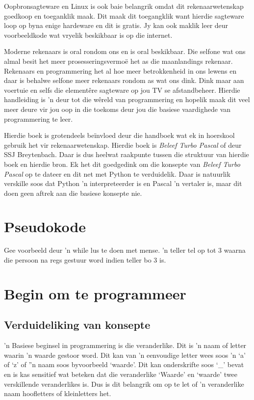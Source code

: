 Oopbronsagteware en Linux is ook baie belangrik omdat dit rekenaarwetenskap goedkoop en toeganklik maak.  Dit maak dit toegangklik want hierdie sagteware loop op byna enige hardeware en dit is gratis.  Jy kan ook maklik leer deur voorbeeldkode wat vryelik beskikbaar is op die internet.

Moderne rekenaars is oral rondom ons en is oral beskikbaar.  Die selfone wat ons almal besit het meer prosesseringsvermo\"e het as die maanlandings rekenaar.  Rekenaars en programmering het al hoe meer betrokkenheid in ons lewens en daar is behalwe selfone meer rekenaars rondom as wat ons dink.  Dink maar aan voertuie en selfs die element\^ere sagteware op jou TV se afstandbeheer.  Hierdie handleiding is 'n deur tot die w\^ereld van programmering en hopelik maak dit veel meer deure vir jou oop in die toekoms deur jou die basiese vaardighede van programmering te leer.


Hierdie boek is grotendeels be\"invloed deur die handboek wat ek in ho\:erskool gebruik het vir rekenaarwetenskap.  Hierdie boek is \emph{Beleef Turbo Pascal} of \cite{beleef} deur SSJ Breytenbach.  Daar is dus heelwat raakpunte tussen die struktuur van hierdie boek en hierdie bron.  Ek het dit goedgedink om die konsepte van \emph{Beleef Turbo Pascal} op te dateer en dit net met Python te verduidelik.  Daar is natuurlik verskille soos dat Python 'n interpreteerder is en Pascal 'n vertaler is, maar dit doen geen aftrek aan die basiese konsepte nie.



\chapter[Pseudokode]
{Pseudokode}
  

Gee voorbeeld deur 'n while lus te doen met mense. 'n teller tel op tot 3 waarna die persoon na regs gestuur word indien teller bo 3 is.



\chapter[Die begin]
{Begin om te programmeer}

\section{Verduideliking van konsepte}

'n Basiese beginsel in programmering is die veranderlike.  Dit is 'n naam of letter waarin 'n waarde gestoor word.  Dit kan van 'n eenvoudige letter wees soos 'n `a' of `z' of ''n naam soos byvoorbeeld `waarde'.  Dit kan onderskrifte soos `\_' bevat en is kas sensitief wat beteken dat die veranderlike `Waarde' en `waarde' twee verskillende veranderlikes is.  Dus is dit belangrik om op te let of 'n veranderlike naam hoofletters of kleinletters het.

